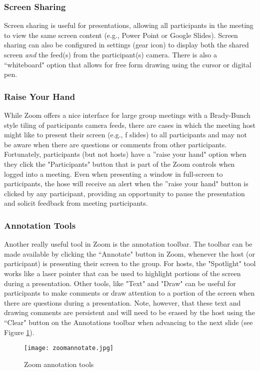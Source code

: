 \subsubsection{Screen Sharing}
    Screen sharing is useful for presentations, allowing all participants in the meeting to view the same screen content (e.g., Power Point or Google Slides). Screen sharing can also be configured in settings (gear icon) to display both the shared screen \textit{and} the feed(s) from the participant(s) camera.  There is also a ``whiteboard" option that allows for free form drawing using the cursor or digital pen.    
\subsubsection{Raise Your Hand}
    While Zoom offers a nice interface for large group meetings with a Brady-Bunch style tiling of participants camera feeds, there are cases in which the meeting host might like to present their screen (e.g., f slides) to all participants and may not be aware when there are questions or comments from other participants.  Fortunately, participants (but not hosts) have a ''raise your hand" option when they click the "Participants" button that is part of the Zoom controls when logged into a meeting.  Even when presenting a window in full-screen to participants, the hose will receive an alert when the ''raise your hand" button is clicked by any participant, providing an opportunity to pause the presentation and solicit feedback from meeting participants.
\subsubsection{Annotation Tools}
    Another really useful tool in Zoom is the annotation toolbar.  The toolbar can be made available by clicking the ``Annotate" button in Zoom, whenever the host (or participant) is presenting their screen to the group.  For hosts, the "Spotlight" tool works like a laser pointer that can be used to highlight portions of the screen during a presentation.  Other tools, like "Text" and "Draw" can be useful for participants to make comments or draw attention to a portion of the screen when there are questions during a presentation.  Note, however, that these text and drawing comments are persistent and will need to be erased by the host using the ``Clear" button on the Annotations toolbar when advancing to the next slide (see Figure \ref{fig:zoomannotate}).
    \begin{figure}[h]
    \centering\texttt{[image: zoomannotate.jpg]}
    \caption{Zoom annotation tools}
    \label{fig:zoomannotate}
    \end{figure}

